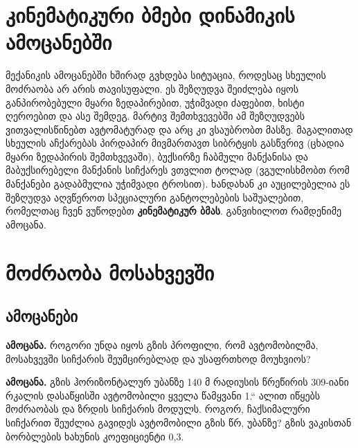 \documentclass{book}
\begin{document}
\section{კინემატიკური ბმები დინამიკის ამოცანებში}
მექანიკის ამოცანებში ხშირად გვხდება სიტუაცია, როდესაც სხეულის მოძრაობა არ არის თავისუფალი. ეს შეზღუდვა შეიძლება იყოს განპირობებული მყარი ზედაპირებით, უჭიმვადი ძაფებით, ხისტი ღეროებით და ასე შემდეგ. მარტივ შემთხვევებში ამ შეზღუდვებს ვითვალისწინებთ ავტომატურად და არც კი ვსაუბრობთ მასზე. მაგალითად სხეულის აჩქარებას პირდაპირ მივმართავთ სიბრტყის გასწვრივ (ცხადია მყარი ზედაპირის შემთხვევაში), ბუქსირზე ჩაბმული მანქანისა და მაბუქსირებელი მანქანის სიჩქარეს ვთვლით ტოლად (ვგულისხმობთ რომ მანქანები გადაბმულია უჭიმვადი ტროსით). ხანდახან კი აუცილებელია ეს შეზღუდვა აღვწეროთ სპეციალური განტოლებების საშუალებით, რომელთაც ჩვენ ვუწოდებთ \textbf{კინემატიკურ ბმას}. განვიხილოთ რამდენიმე ამოცანა.
 
 
\section{მოძრაობა მოსახვევში}
\subsection{ამოცანები}
\textbf{ამოცანა.} როგორი უნდა იყოს გზის პროფილი, რომ ავტომობილმა, მოსახვევში სიჩქარის შეუმცირებლად და უსაფრთხოდ მოუხვიოს?

\textbf{ამოცანა.} გზის ჰორიზონტალურ უბანზე 140 მ რადიუსის წრეწირის 309-იანი რკალის დასაწყისში ავტომობილი ყველა წამყვანი 1.“
ალით იწყებს მოძრაობას და ზრდის სიჩქარის მოდულს. როგორ,
ჩაქსიმალური სიჩქარით შეუძლია გავიდეს ავტომობილი გზის წრ,
უბანზე? გზის ვაკისთან ბორბლების ხახუნის კოეფიციენტი 0,3.
\end{document}
